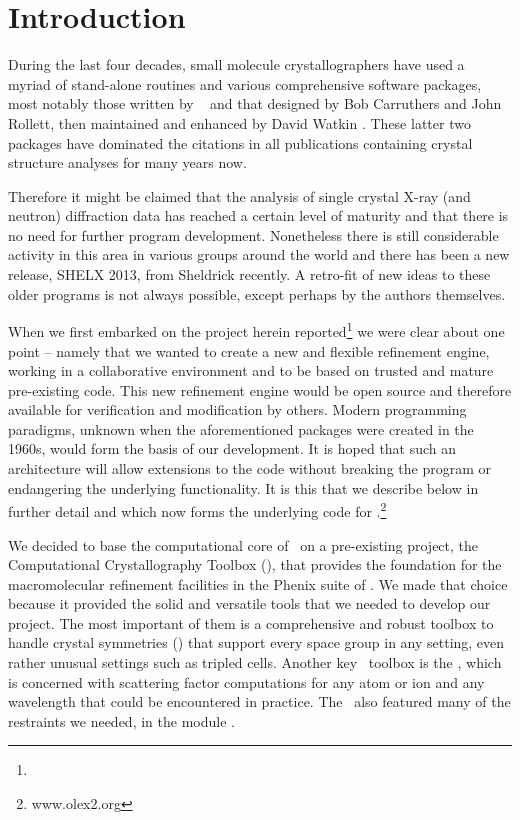 \documentclass[11pt]{article}
\begin{document}
\section{Introduction}
\label{sec:introduction}
  
During the last four decades, small molecule crystallographers have used a myriad of stand-alone routines and various comprehensive software packages, most notably those written by ~\citeyear{Sheldrick:2008aa,Sheldrick:1997aa} and that designed by Bob Carruthers and John Rollett, then maintained and enhanced by David Watkin \cite{Betteridge:2003ab}. These latter two packages have dominated the citations in all publications containing crystal structure analyses for many years now.

Therefore it might be claimed that the analysis of single crystal X-ray (and neutron) diffraction data has reached a certain level of maturity and that there is no need for further program development. Nonetheless there is still considerable activity in this area in various groups around the world and there has been a new release, SHELX 2013, from Sheldrick  recently. A retro-fit of new ideas to these older programs is not always possible, except perhaps by the authors themselves. 

When we first embarked on the project herein reported\footnote{\ourEPSRCgrant} we were clear about one point -- namely that we wanted to create a new and flexible refinement engine, working in a collaborative environment and to be based on trusted and mature pre-existing code. This new refinement engine would be open source and therefore available for verification and modification by others. Modern programming paradigms, unknown when the aforementioned packages were created in the 1960s, would form the basis of our development. It is hoped that such an architecture will allow extensions to the code without breaking the program or endangering the underlying functionality. It is this that we describe below in further detail and which now forms the underlying code for \olexrefine.\footnote{www.olex2.org}

We decided to base the computational core of \olexrefine\ on a pre-existing project, the Computational Crystallography Toolbox (\cctbx), that provides the foundation for the macromolecular refinement facilities in the Phenix suite of . We made that choice because it provided the solid and versatile tools \cite{Grosse-Kunstleve:2003aa} that we needed to develop our project. The most important of them is a comprehensive and robust toolbox to handle crystal symmetries (\sgtbx) that support every space group in any setting, even rather unusual settings such as tripled cells. Another key \cctbx\ toolbox is the \eltbx, which is concerned with scattering factor computations for any atom or ion and any wavelength that could be encountered in practice. The \cctbx\ also featured many of the restraints we needed, in the module \cctbxrestraints. 
\end{document}
